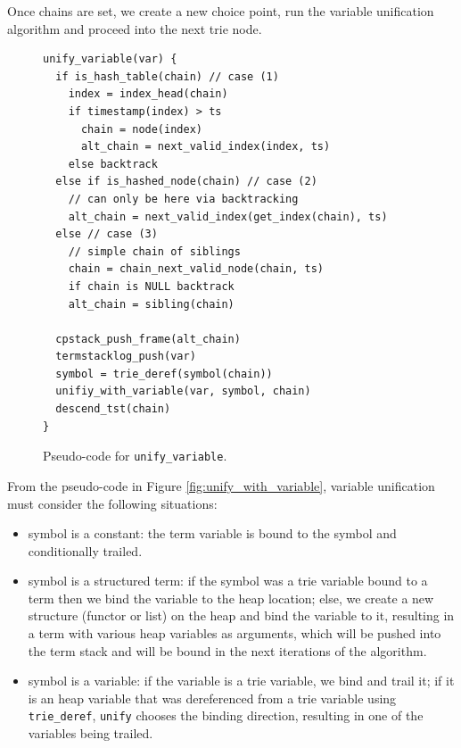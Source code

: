 Once chains are set, we create a new choice point, run the variable unification algorithm
and proceed into the next trie node.

\begin{figure}[H]
\begin{Verbatim}[fontsize=\small]
unify_variable(var) {
  if is_hash_table(chain) // case (1)
    index = index_head(chain)
    if timestamp(index) > ts
      chain = node(index)
      alt_chain = next_valid_index(index, ts)
    else backtrack
  else if is_hashed_node(chain) // case (2)
    // can only be here via backtracking
    alt_chain = next_valid_index(get_index(chain), ts)
  else // case (3)
    // simple chain of siblings
    chain = chain_next_valid_node(chain, ts)
    if chain is NULL backtrack
    alt_chain = sibling(chain)
  
  cpstack_push_frame(alt_chain)
  termstacklog_push(var)
  symbol = trie_deref(symbol(chain))
  unifiy_with_variable(var, symbol, chain)
  descend_tst(chain)
}
\end{Verbatim}
\caption{Pseudo-code for \texttt{unify\_variable}.}
\label{fig:unify_variable}
\end{figure}

From the pseudo-code in Figure \ref{fig:unify_with_variable}, variable unification
must consider the following situations:

\begin{itemize}
  \item symbol is a constant: the term variable is bound to the symbol and conditionally trailed.
  \item symbol is a structured term: if the symbol was a trie variable bound to a term then we bind the variable to the heap location; else, we create a new structure (functor or list) on the heap and bind the variable to it, resulting in a term with various heap variables as arguments, which will be pushed into the term stack and will be bound in the next iterations of the algorithm.
  \item symbol is a variable: if the variable is a trie variable, we bind and trail it; if it is an heap variable that was dereferenced from a trie variable using \texttt{trie\_deref}, \texttt{unify} chooses the binding direction, resulting in one of the variables being trailed.
\end{itemize}


